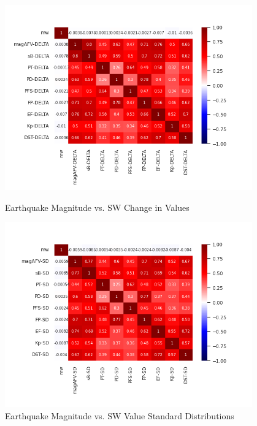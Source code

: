 \documentclass[12pt]{article}
\begin{document}
\begin{figure}
\centering
  \includegraphics[width=0.95\textwidth]{corr-mw-DELTA.png}
  \caption{Earthquake Magnitude vs. SW Change in Values}

  \includegraphics[width=0.95\textwidth]{corr-mw-SD.png}
  \caption{Earthquake Magnitude vs. SW Value Standard Distributions}

\end{figure}

\newpage
\end{document}

